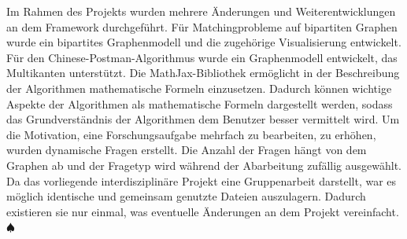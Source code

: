 Im Rahmen des Projekts wurden mehrere Änderungen und Weiterentwicklungen an dem Framework durchgeführt. Für Matchingprobleme auf bipartiten Graphen wurde ein bipartites Graphenmodell und die zugehörige Visualisierung entwickelt. Für den Chinese-Postman-Algorithmus wurde ein Graphenmodell entwickelt, das Multikanten unterstützt. 
Die MathJax-Bibliothek ermöglicht in der Beschreibung der Algorithmen mathematische Formeln einzusetzen. Dadurch können wichtige Aspekte der Algorithmen als mathematische Formeln dargestellt werden, sodass das Grundverständnis der Algorithmen dem Benutzer besser vermittelt wird.
Um die Motivation, eine Forschungsaufgabe mehrfach zu bearbeiten, zu erhöhen, wurden dynamische Fragen erstellt. Die Anzahl der Fragen hängt von dem Graphen ab und der Fragetyp wird während der Abarbeitung zufällig ausgewählt. Da das vorliegende interdisziplinäre Projekt eine Gruppenarbeit darstellt, war es möglich identische und gemeinsam genutzte Dateien auszulagern. Dadurch existieren sie nur einmal, was eventuelle Änderungen an dem Projekt vereinfacht. \hfill$\spadesuit$
